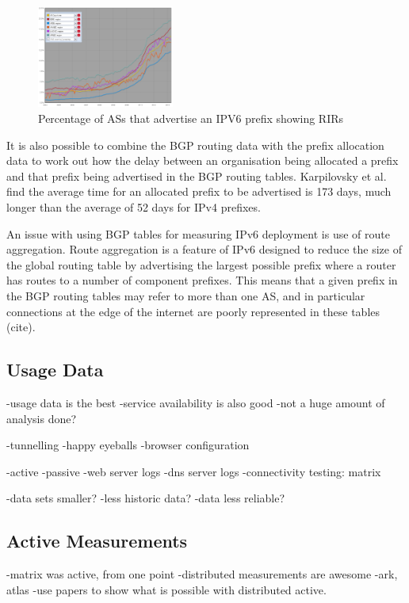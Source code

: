 \begin{figure}[htb]
\centering
\includegraphics[width=0.4\textwidth]{img/v6-bgp-rirs.png}
\caption{Percentage of ASs that advertise an IPV6 prefix showing RIRs}
\label{fig:bgp-rirs}
\end{figure}

It is also possible to combine the BGP routing data with the prefix allocation
data to work out how the delay between an organisation being allocated a prefix
and that prefix being advertised in the BGP routing tables. Karpilovsky et al.
find the average time for an allocated prefix to be advertised is 173 days, much
longer than the average of 52 days for IPv4 prefixes.

An issue with using BGP tables for measuring IPv6 deployment is use of route
aggregation. Route aggregation is a feature of IPv6 designed to reduce the size of the
global routing table by advertising the largest possible prefix where a router
has routes to a number of component prefixes. This means that a given prefix in
the BGP routing tables may refer to more than one AS, and in particular
connections at the edge of the internet are poorly represented in these
tables (cite).


\subsection{Usage Data}

-usage data is the best
-service availability is also good
-not a huge amount of analysis done?

-tunnelling
-happy eyeballs
-browser configuration

-active
-passive
-web server logs
-dns server logs
-connectivity testing: matrix

-data sets smaller?
-less historic data?
-data less reliable?

\subsection{Active Measurements}

-matrix was active, from one point
-distributed measurements are awesome
-ark, atlas
-use papers to show what is possible with distributed active.

